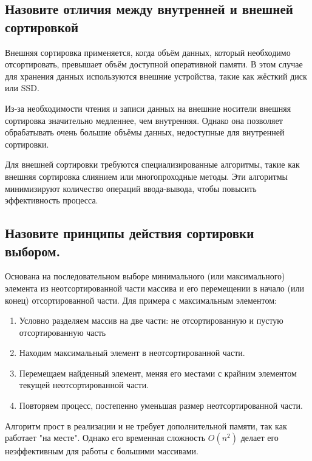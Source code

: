 \documentclass[a4paper,12pt]{article}
\begin{document}
	\subsection{Назовите отличия между внутренней и внешней сортировкой}
	
	Внешняя сортировка применяется, когда объём данных, который необходимо отсортировать, превышает объём доступной оперативной памяти. В этом случае для хранения данных используются внешние устройства, такие как жёсткий диск или SSD.
	
	Из-за необходимости чтения и записи данных на внешние носители внешняя сортировка значительно медленнее, чем внутренняя. Однако она позволяет обрабатывать очень большие объёмы данных, недоступные для внутренней сортировки.
	
	Для внешней сортировки требуются специализированные алгоритмы, такие как внешняя сортировка слиянием или многопроходные методы. Эти алгоритмы минимизируют количество операций ввода-вывода, чтобы повысить эффективность процесса.
	
	\subsection{Назовите принципы действия сортировки выбором.}
	
	Основана на последовательном выборе минимального (или максимального) элемента из неотсортированной части массива и его перемещении в начало (или конец) отсортированной части. Для примера с максимальным элементом:
	
	\begin{enumerate}

		\item Условно разделяем массив на две части: не отсортированную и пустую отсортированную часть
		
		\item Находим максимальный элемент в неотсортированной части.
		
		\item Перемещаем найденный элемент, меняя его местами с крайним элементом текущей неотсортированной части.
		
		\item Повторяем процесс, постепенно уменьшая размер неотсортированной части.
	
	\end{enumerate}

	Алгоритм прост в реализации и не требует дополнительной памяти, так как работает "на месте". Однако его временная сложность $O(n^{2})$ делает его неэффективным для работы с большими массивами.
\end{document}
